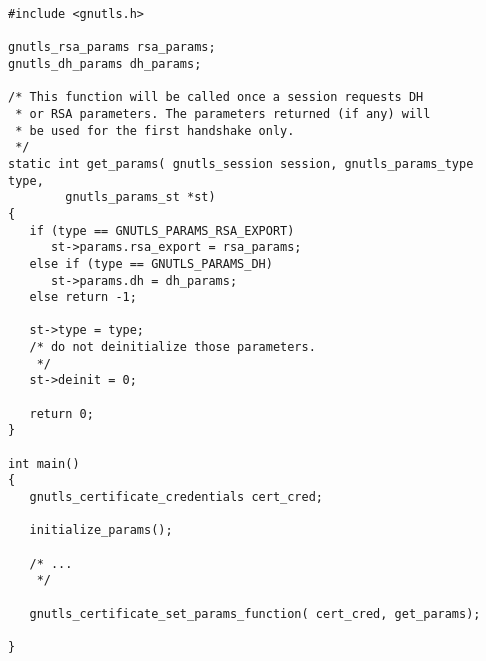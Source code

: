 \begin{verbatim}
#include <gnutls.h>

gnutls_rsa_params rsa_params;
gnutls_dh_params dh_params;

/* This function will be called once a session requests DH
 * or RSA parameters. The parameters returned (if any) will
 * be used for the first handshake only.
 */
static int get_params( gnutls_session session, gnutls_params_type type,
        gnutls_params_st *st)
{
   if (type == GNUTLS_PARAMS_RSA_EXPORT)
      st->params.rsa_export = rsa_params;
   else if (type == GNUTLS_PARAMS_DH)
      st->params.dh = dh_params;
   else return -1;

   st->type = type;
   /* do not deinitialize those parameters.
    */
   st->deinit = 0;

   return 0;
}

int main()
{
   gnutls_certificate_credentials cert_cred;

   initialize_params();

   /* ...
    */

   gnutls_certificate_set_params_function( cert_cred, get_params);

}
\end{verbatim}
